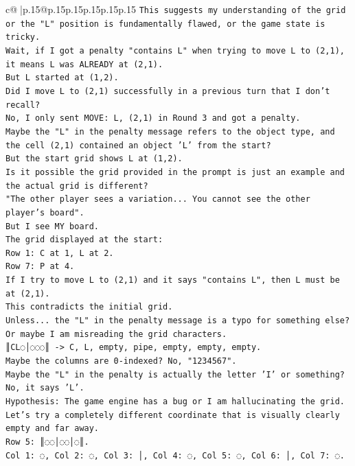 \documentclass{article}
\begin{document}
{\begin{supertabular}{c@{$\;$}|p{.15\linewidth}@{}p{.15\linewidth}p{.15\linewidth}p{.15\linewidth}p{.15\linewidth}p{.15\linewidth}}
{{{\texttt{This suggests my understanding of the grid or the "L" position is fundamentally flawed, or the game state is tricky.} \\
\texttt{Wait, if I got a penalty "contains L" when trying to move L to (2,1), it means L was ALREADY at (2,1).} \\
\texttt{But L started at (1,2).} \\
\texttt{Did I move L to (2,1) successfully in a previous turn that I don't recall?} \\
\texttt{No, I only sent MOVE: L, (2,1) in Round 3 and got a penalty.} \\
\texttt{Maybe the "L" in the penalty message refers to the object type, and the cell (2,1) contained an object 'L' from the start?} \\
\texttt{But the start grid shows L at (1,2).} \\
\texttt{Is it possible the grid provided in the prompt is just an example and the actual grid is different?} \\
\texttt{"The other player sees a variation... You cannot see the other player's board".} \\
\texttt{But I see MY board.} \\
\texttt{The grid displayed at the start:} \\
\texttt{Row 1: C at 1, L at 2.} \\
\texttt{Row 7: P at 4.} \\
\texttt{If I try to move L to (2,1) and it says "contains L", then L must be at (2,1).} \\
\texttt{This contradicts the initial grid.} \\
\texttt{Unless... the "L" in the penalty message is a typo for something else? Or maybe I am misreading the grid characters.} \\
\texttt{║CL◌│◌◌◌║ {-}> C, L, empty, pipe, empty, empty, empty.} \\
\texttt{Maybe the columns are 0{-}indexed? No, "1234567".} \\
\texttt{Maybe the "L" in the penalty is actually the letter 'I' or something? No, it says 'L'.} \\
\texttt{Hypothesis: The game engine has a bug or I am hallucinating the grid.} \\
\texttt{Let's try a completely different coordinate that is visually clearly empty and far away.} \\
\texttt{Row 5: ║◌◌│◌◌│◌║.} \\
\texttt{Col 1: ◌, Col 2: ◌, Col 3: │, Col 4: ◌, Col 5: ◌, Col 6: │, Col 7: ◌.} \\
}}}
\end{supertabular}}
\end{document}

